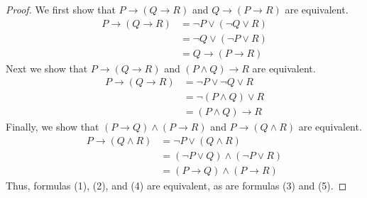 \documentclass[12pt]{amsart}
\theoremstyle{definition}
\theoremstyle{remark}
\begin{document}
\begin{proof}
We first show that $P \rightarrow (Q \rightarrow R)$ and $Q \rightarrow (P \rightarrow R)$ are equivalent.
\begin{align*}
	P \rightarrow (Q \rightarrow R)
	&= \neg P \vee (\neg Q \vee R) \\
	&= \neg Q \vee (\neg P \vee R) \\
	&= Q \rightarrow (P \rightarrow R)
\end{align*}
Next we show that $P \rightarrow (Q \rightarrow R)$ and $(P \wedge Q) \rightarrow R$ are equivalent.
\begin{align*}
	P \rightarrow (Q \rightarrow R)
	&= \neg P \vee \neg Q \vee R \\
	&= \neg (P \wedge Q) \vee R \\
	&= (P \wedge Q) \rightarrow R
\end{align*}
Finally, we show that $(P \rightarrow Q) \wedge (P \rightarrow R)$ and $P \rightarrow (Q \wedge R)$ are equivalent.
\begin{align*}
	P \rightarrow (Q \wedge R)
	&= \neg P \vee (Q \wedge R) \\
	&= (\neg P \vee Q) \wedge (\neg P \vee R) \\
	&= (P \rightarrow Q) \wedge (P \rightarrow R)
\end{align*}
Thus, formulas (1), (2), and (4) are equivalent, as are formulas (3) and (5).
\end{proof}
\end{document}
